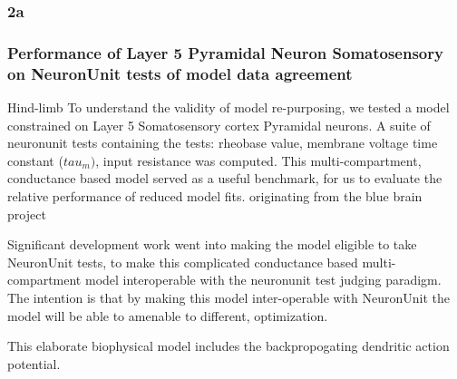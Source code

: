 \subsubsection{2a}




%
%
\subsubsection{Performance of Layer 5 Pyramidal Neuron Somatosensory on NeuronUnit tests of model data agreement}
Hind-limb
\cite{van2016bluepyopt}
To understand the validity of model re-purposing, we tested a model constrained on Layer 5 Somatosensory cortex Pyramidal neurons. A suite of neuronunit tests containing the tests: rheobase value, membrane voltage time constant ($tau_{m})$, input resistance was computed. This multi-compartment, conductance based model served as a useful benchmark, for us to evaluate the relative performance of reduced model fits. originating from the blue brain project \cite{markram2015reconstruction}




Significant development work went into making the model eligible to take NeuronUnit tests, to make this complicated conductance based multi-compartment model interoperable with the neuronunit test judging paradigm. The intention is that by making this model inter-operable with NeuronUnit the model will be able to amenable to different, optimization.

This elaborate biophysical model includes the backpropogating dendritic action potential.



